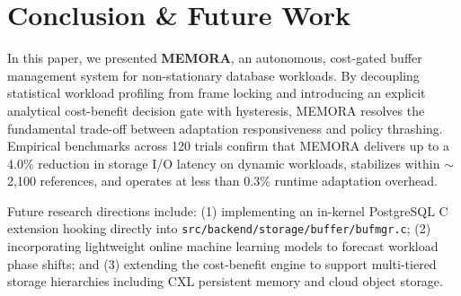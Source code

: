 \documentclass[conference]{IEEEtran}
\begin{document}
\section{Conclusion \& Future Work}
In this paper, we presented \textbf{MEMORA}, an autonomous, cost-gated buffer management system for non-stationary database workloads. By decoupling statistical workload profiling from frame locking and introducing an explicit analytical cost-benefit decision gate with hysteresis, MEMORA resolves the fundamental trade-off between adaptation responsiveness and policy thrashing. Empirical benchmarks across 120 trials confirm that MEMORA delivers up to a 4.0\% reduction in storage I/O latency on dynamic workloads, stabilizes within $\sim$2,100 references, and operates at less than 0.3\% runtime adaptation overhead.

Future research directions include: (1) implementing an in-kernel PostgreSQL C extension hooking directly into \texttt{src/backend/storage/buffer/bufmgr.c}; (2) incorporating lightweight online machine learning models to forecast workload phase shifts; and (3) extending the cost-benefit engine to support multi-tiered storage hierarchies including CXL persistent memory and cloud object storage.

\balance


\end{document}
